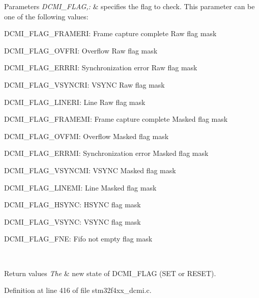 \begin{DoxyParams}{Parameters}
{\em D\-C\-M\-I\-\_\-\-F\-L\-A\-G,\-:} & specifies the flag to check. This parameter can be one of the following values\-: \begin{DoxyItemize}
\item D\-C\-M\-I\-\_\-\-F\-L\-A\-G\-\_\-\-F\-R\-A\-M\-E\-R\-I\-: Frame capture complete Raw flag mask \item D\-C\-M\-I\-\_\-\-F\-L\-A\-G\-\_\-\-O\-V\-F\-R\-I\-: Overflow Raw flag mask \item D\-C\-M\-I\-\_\-\-F\-L\-A\-G\-\_\-\-E\-R\-R\-R\-I\-: Synchronization error Raw flag mask \item D\-C\-M\-I\-\_\-\-F\-L\-A\-G\-\_\-\-V\-S\-Y\-N\-C\-R\-I\-: V\-S\-Y\-N\-C Raw flag mask \item D\-C\-M\-I\-\_\-\-F\-L\-A\-G\-\_\-\-L\-I\-N\-E\-R\-I\-: Line Raw flag mask \item D\-C\-M\-I\-\_\-\-F\-L\-A\-G\-\_\-\-F\-R\-A\-M\-E\-M\-I\-: Frame capture complete Masked flag mask \item D\-C\-M\-I\-\_\-\-F\-L\-A\-G\-\_\-\-O\-V\-F\-M\-I\-: Overflow Masked flag mask \item D\-C\-M\-I\-\_\-\-F\-L\-A\-G\-\_\-\-E\-R\-R\-M\-I\-: Synchronization error Masked flag mask \item D\-C\-M\-I\-\_\-\-F\-L\-A\-G\-\_\-\-V\-S\-Y\-N\-C\-M\-I\-: V\-S\-Y\-N\-C Masked flag mask \item D\-C\-M\-I\-\_\-\-F\-L\-A\-G\-\_\-\-L\-I\-N\-E\-M\-I\-: Line Masked flag mask \item D\-C\-M\-I\-\_\-\-F\-L\-A\-G\-\_\-\-H\-S\-Y\-N\-C\-: H\-S\-Y\-N\-C flag mask \item D\-C\-M\-I\-\_\-\-F\-L\-A\-G\-\_\-\-V\-S\-Y\-N\-C\-: V\-S\-Y\-N\-C flag mask \item D\-C\-M\-I\-\_\-\-F\-L\-A\-G\-\_\-\-F\-N\-E\-: Fifo not empty flag mask \end{DoxyItemize}
\\
\hline
\end{DoxyParams}

\begin{DoxyRetVals}{Return values}
{\em The} & new state of D\-C\-M\-I\-\_\-\-F\-L\-A\-G (S\-E\-T or R\-E\-S\-E\-T). \\
\hline
\end{DoxyRetVals}


Definition at line 416 of file stm32f4xx\-\_\-dcmi.\-c.

